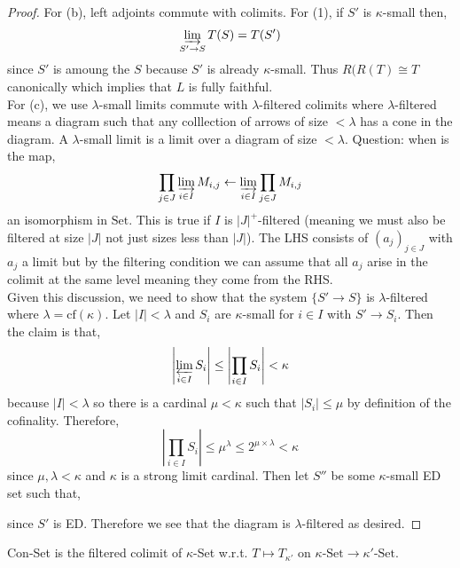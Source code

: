 \documentclass[12pt]{article}
\newcommand{\cf}{\mathrm{cf}}
\begin{document}
\begin{proof}
For (b), left adjoints commute with colimits. For (1), if $S'$ is $\kappa$-small then,
\[ \operatorname*{\varinjlim}_{S' \to S} T(S) = T(S') \]
since $S'$ is amoung the $S$ because $S'$ is already $\kappa$-small.
Thus $R(R(T) \cong T$ canonically which implies that $L$ is fully faithful.
\bigskip\\
For (c), we use $\lambda$-small limits commute with $\lambda$-filtered colimits where $\lambda$-filtered means a diagram such that any colllection of arrows of size $< \lambda$ has a cone in the diagram. A $\lambda$-small limit is a limit over a diagram of size $< \lambda$. Question: when is the map,
\[ \prod_{j \in J} \operatorname*{\varinjlim}_{i \in I} M_{i,j} \leftarrow \operatorname*{\varinjlim}_{i \in I} \prod_{j \in J} M_{i,j} \]
an isomorphism in $\mathrm{Set}$. This is true if $I$ is $|J|^+$-filtered (meaning we must also be filtered at size $|J|$ not just sizes less than $|J|$). The LHS consists of $(a_j)_{j \in J}$ with $a_j$ a limit but by the filtering condition we can assume that all $a_j$ arise in the colimit at the same level meaning they come from the RHS. 
\bigskip\\
Given this discussion, we need to show that the system $\{ S' \to S \}$ is $\lambda$-filtered where $\lambda = \cf(\kappa)$. Let $|I| < \lambda$ and $S_i$ are $\kappa$-small for $i \in I$ with $S' \to S_i$. Then the claim is that,
\[ \left| \operatorname*{\varprojlim}_{i \in I} S_i \right| \le \left| \prod_{i \in I} S_i \right| < \kappa \]
because $|I| < \lambda$ so there is a cardinal $\mu < \kappa$ such that $|S_i| \le \mu$ by definition of the cofinality. Therefore,
\[ \left| \prod_{i \in I} S_i \right| \le \mu^\lambda \le 2^{\mu \times \lambda} < \kappa \]
since $\mu, \lambda < \kappa$ and $\kappa$ is a strong limit cardinal.
Then let $S''$ be some $\kappa$-small ED set such that,
\begin{center}
\end{center}
since $S'$ is ED. Therefore we see that the diagram is $\lambda$-filtered as desired. 
\end{proof}

\begin{defn}
Con-Set is the filtered colimit of $\kappa$-Set w.r.t. $T \mapsto T_{\kappa'}$ on $\kappa\text{-Set} \to \kappa'\text{-Set}$.
\end{defn}
\end{document}
